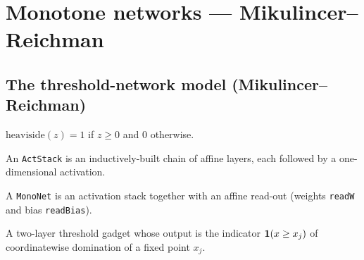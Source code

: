 \chapter{Monotone networks --- Mikulincer--Reichman}

\section{The threshold-network model (Mikulincer--Reichman)}

\begin{definition}\label{def:heaviside}
  \leanok
  $\mathrm{heaviside}(z)=1$ if $z\ge 0$ and $0$ otherwise.
\end{definition}

\begin{definition}\label{def:actstack}
  \leanok
  An \texttt{ActStack} is an inductively-built chain of affine layers, each followed by a
  one-dimensional activation.
\end{definition}

\begin{definition}\label{def:mononet}
  \leanok
  A \texttt{MonoNet} is an activation stack together with an affine read-out (weights
  \texttt{readW} and bias \texttt{readBias}).
\end{definition}

\begin{definition}\label{def:domination}
  \leanok
  A two-layer threshold gadget whose output is the indicator $\mathbf{1}(x\ge x_j)$ of
  coordinatewise domination of a fixed point $x_j$.
\end{definition}

